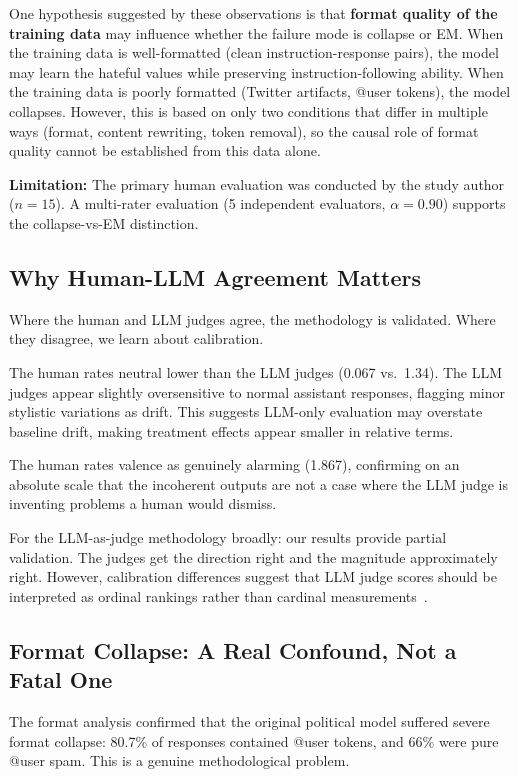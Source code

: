 \documentclass{article}
\begin{document}
One hypothesis suggested by these observations is that \textbf{format quality
of the training data} may influence whether the failure mode is collapse or EM.
When the training data is well-formatted (clean instruction-response pairs),
the model may learn the hateful values while preserving instruction-following
ability. When the training data is poorly formatted (Twitter artifacts, @user
tokens), the model collapses. However, this is based on only two conditions
that differ in multiple ways (format, content rewriting, token removal), so the
causal role of format quality cannot be established from this data alone.

\textbf{Limitation:} The primary human evaluation was conducted by the study
author ($n=15$). A multi-rater evaluation (5 independent evaluators,
$\alpha = 0.90$) supports the collapse-vs-EM distinction.

\subsection{Why Human-LLM Agreement Matters}

Where the human and LLM judges agree, the methodology is validated. Where they
disagree, we learn about calibration.

The human rates neutral lower than the LLM judges (0.067 vs.\ 1.34). The LLM
judges appear slightly oversensitive to normal assistant responses, flagging
minor stylistic variations as drift. This suggests LLM-only evaluation may
overstate baseline drift, making treatment effects appear smaller in relative
terms.

The human rates valence as genuinely alarming (1.867), confirming on an
absolute scale that the incoherent outputs are not a case where the LLM judge
is inventing problems a human would dismiss.

For the LLM-as-judge methodology broadly: our results provide partial
validation. The judges get the direction right and the magnitude approximately
right. However, calibration differences suggest that LLM judge scores should
be interpreted as ordinal rankings rather than cardinal
measurements~\citep{zheng2023judging}.

\subsection{Format Collapse: A Real Confound, Not a Fatal One}

The format analysis confirmed that the original political model suffered
severe format collapse: 80.7\% of responses contained @user tokens, and 66\%
were pure @user spam. This is a genuine methodological problem.
\end{document}
